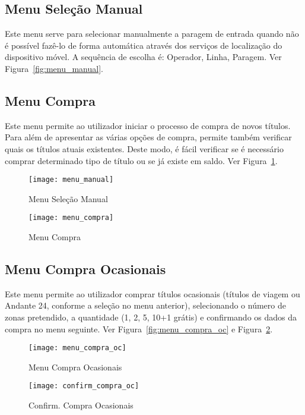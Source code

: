 \subsection{Menu Seleção Manual}

Este menu serve para selecionar manualmente a paragem de entrada quando não é possível fazê-lo de forma automática através dos serviços de localização do dispositivo móvel. A sequência de escolha é: Operador, Linha, Paragem. Ver Figura~\ref{fig:menu_manual}.

\subsection{Menu Compra}

Este menu permite ao utilizador iniciar o processo de compra de novos títulos. Para além de apresentar as várias opções de compra, permite também verificar quais os títulos atuais existentes. Deste modo, é fácil verificar se é necessário comprar determinado tipo de título ou se já existe em saldo. Ver Figura~\ref{fig:menu_compra}.

\begin{figure}[ht]
\begin{minipage}[b]{0.45\linewidth}
\centering
\texttt{[image: menu\_manual]}
    \caption{Menu Seleção Manual}
    \label{fig:menu_manual}
\end{minipage}
\hspace{0.5cm}
\begin{minipage}[b]{0.45\linewidth}
\centering
    \texttt{[image: menu\_compra]}
    \caption{Menu Compra}
    \label{fig:menu_compra}
\end{minipage}
\end{figure}

\subsection{Menu Compra Ocasionais}

Este menu permite ao utilizador comprar títulos ocasionais (títulos de viagem ou Andante 24, conforme a seleção no menu anterior), selecionando o número de zonas pretendido, a quantidade (1, 2, 5, 10+1 grátis) e confirmando os dados da compra no menu seguinte. Ver Figura~\ref{fig:menu_compra_oc} e Figura~\ref{fig:confirm_compra_oc}.

\begin{figure}[ht]
\begin{minipage}[b]{0.45\linewidth}
\centering
\texttt{[image: menu\_compra\_oc]}
    \caption{Menu Compra Ocasionais}
    \label{fig:menu_compra_oc}
\end{minipage}
\hspace{0.5cm}
\begin{minipage}[b]{0.45\linewidth}
\centering
    \texttt{[image: confirm\_compra\_oc]}
    \caption{Confirm. Compra Ocasionais}
    \label{fig:confirm_compra_oc}
\end{minipage}
\end{figure}

